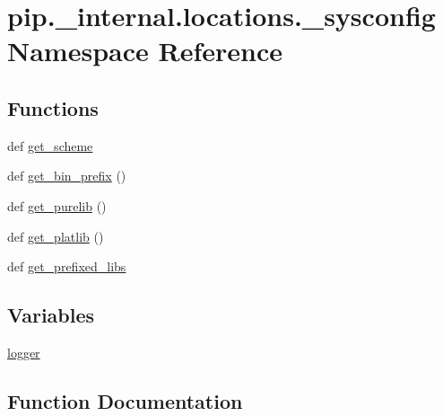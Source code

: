 \hypertarget{namespacepip_1_1__internal_1_1locations_1_1__sysconfig}{}\section{pip.\+\_\+internal.\+locations.\+\_\+sysconfig Namespace Reference}
\label{namespacepip_1_1__internal_1_1locations_1_1__sysconfig}
\subsection*{Functions}
\begin{DoxyCompactItemize}
\item 
def \hyperlink{namespacepip_1_1__internal_1_1locations_1_1__sysconfig_a8829863cba210084406b4499c48351ba}{get\+\_\+scheme}
\item 
def \hyperlink{namespacepip_1_1__internal_1_1locations_1_1__sysconfig_ac27d9028d927ec6c4a37b76702c5fc83}{get\+\_\+bin\+\_\+prefix} ()
\item 
def \hyperlink{namespacepip_1_1__internal_1_1locations_1_1__sysconfig_adf55861d1b9d41459ff5d503801846e9}{get\+\_\+purelib} ()
\item 
def \hyperlink{namespacepip_1_1__internal_1_1locations_1_1__sysconfig_a19e1734fdf1a7c25748ab24237d125e4}{get\+\_\+platlib} ()
\item 
def \hyperlink{namespacepip_1_1__internal_1_1locations_1_1__sysconfig_a50d7a8c4dacda6e2c864034d5fe90d4c}{get\+\_\+prefixed\+\_\+libs}
\end{DoxyCompactItemize}
\subsection*{Variables}
\begin{DoxyCompactItemize}
\item 
\hyperlink{namespacepip_1_1__internal_1_1locations_1_1__sysconfig_ad330345993c7877cc5399a6d3edb733f}{logger}
\end{DoxyCompactItemize}


\subsection{Function Documentation}
\mbox{\label{namespacepip_1_1__internal_1_1locations_1_1__sysconfig_ac27d9028d927ec6c4a37b76702c5fc83}} 

